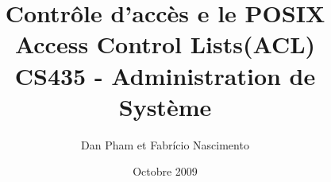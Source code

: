 \usepackage[francais]{babel}
\usepackage[utf8]{inputenc}

\usepackage{graphicx} 

\usepackage{algorithmic}
\usepackage{algorithm}


\title{\textbf{Contrôle d'accès e le POSIX Access Control Lists(ACL)} \\ CS435 - Administration de Système }
\author{Dan Pham et Fabrício Nascimento}
\date{Octobre 2009}



\maketitle
\newpage










